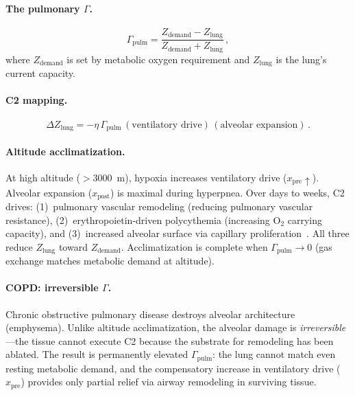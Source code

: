 \documentclass[aps,pre,twocolumn,superscriptaddress,floatfix]{revtex4-2}
\begin{document}
\paragraph{The pulmonary $\Gamma$.}
\begin{equation}
  \Gamma_{\text{pulm}} =
  \frac{Z_{\text{demand}} - Z_{\text{lung}}}
       {Z_{\text{demand}} + Z_{\text{lung}}}\,,
  \label{eq:gamma-pulm}
\end{equation}
where $Z_{\text{demand}}$ is set by metabolic
oxygen requirement and $Z_{\text{lung}}$ is the
lung's current capacity.

\paragraph{C2 mapping.}
\begin{equation}
  \Delta Z_{\text{lung}} =
  -\eta\,\Gamma_{\text{pulm}}\,
  (\text{ventilatory drive})\,
  (\text{alveolar expansion})\,.
  \label{eq:c2-pulm}
\end{equation}

\paragraph{Altitude acclimatization.}
At high altitude ($>3000$~m), hypoxia increases
ventilatory drive ($x_{\text{pre}} \uparrow$).
Alveolar expansion ($x_{\text{post}}$) is maximal
during hyperpnea.  Over days to weeks, C2 drives:
(1)~pulmonary vascular remodeling (reducing pulmonary
vascular resistance), (2)~erythropoietin-driven
polycythemia (increasing O$_2$ carrying capacity),
and (3)~increased alveolar surface via
capillary proliferation~\cite{Hackett2001,West2012}.
All three reduce $Z_{\text{lung}}$ toward
$Z_{\text{demand}}$.  Acclimatization is complete
when $\Gamma_{\text{pulm}} \to 0$ (gas exchange
matches metabolic demand at altitude).

\paragraph{COPD: irreversible $\Gamma$.}
Chronic obstructive pulmonary disease
destroys alveolar architecture (emphysema).
Unlike altitude acclimatization, the alveolar damage
is \emph{irreversible}---the tissue cannot execute
C2 because the substrate for remodeling has been
ablated.  The result is permanently elevated
$\Gamma_{\text{pulm}}$:
the lung cannot match even resting metabolic
demand, and the compensatory increase in
ventilatory drive ($x_{\text{pre}}$) provides
only partial relief via airway remodeling
in surviving tissue.
\end{document}
